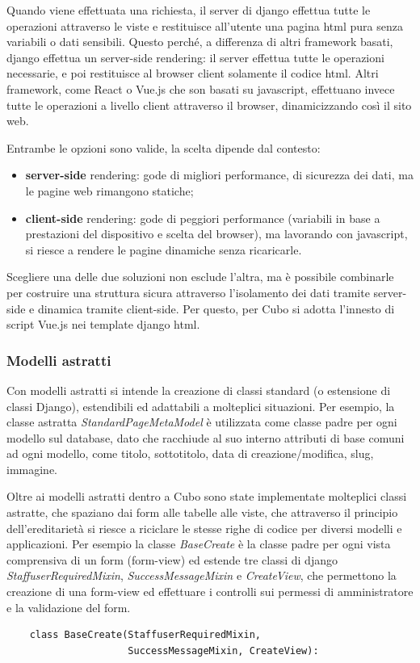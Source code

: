 \documentclass[12pt,a4paper]{article}
\begin{document}
Quando viene effettuata una richiesta, il server di django effettua tutte le operazioni attraverso le viste e restituisce all’utente una pagina html pura senza variabili o dati sensibili. Questo perché, a differenza di altri framework basati, django effettua un server-side rendering: il server effettua tutte le operazioni necessarie, e poi restituisce al browser client solamente il codice html.
Altri framework, come React o Vue.js che son basati su javascript, effettuano invece tutte le operazioni a livello client attraverso il browser, dinamicizzando così il sito web.


Entrambe le opzioni sono valide, la scelta dipende dal contesto:
\begin{itemize}
    \item \textbf{server-side} rendering: gode di migliori performance, di sicurezza dei dati, ma le pagine web rimangono statiche;
    \item \textbf{client-side} rendering: gode di peggiori performance (variabili in base a prestazioni del dispositivo e scelta del browser), ma lavorando con javascript, si riesce a rendere le pagine dinamiche senza ricaricarle.
\end{itemize}
Scegliere una delle due soluzioni non esclude l’altra, ma è possibile combinarle per costruire una struttura sicura attraverso l’isolamento dei dati tramite server-side e dinamica tramite client-side. Per questo, per Cubo si adotta l’innesto di script Vue.js nei template django html.

\subsubsection{Modelli astratti}
Con modelli astratti si intende la creazione di classi standard (o estensione di classi Django), estendibili ed adattabili a molteplici situazioni. Per esempio, la classe astratta \textit{StandardPageMetaModel} è utilizzata come classe padre per ogni modello sul database, dato che racchiude al suo interno attributi di base comuni ad ogni modello, come titolo, sottotitolo, data di creazione/modifica, slug, immagine.

Oltre ai modelli astratti dentro a Cubo sono state implementate molteplici classi astratte, che spaziano dai form alle tabelle alle viste, che attraverso il principio dell'ereditarietà si riesce a riciclare le stesse righe di codice per diversi modelli e applicazioni. Per esempio la classe \textit{BaseCreate} è la classe padre per ogni vista comprensiva di un form (form-view) ed estende tre classi di django \textit{StaffuserRequiredMixin}, \textit{SuccessMessageMixin} e \textit{CreateView}, che permettono la creazione di una form-view ed effettuare i controlli sui permessi di amministratore e la validazione del form.
\begin{verbatim}
    class BaseCreate(StaffuserRequiredMixin,
                     SuccessMessageMixin, CreateView):
\end{verbatim}
\end{document}

